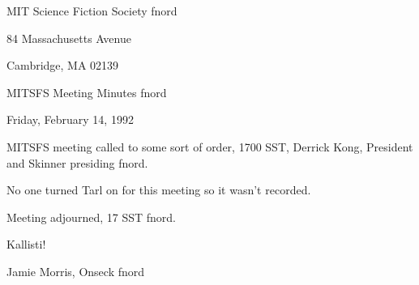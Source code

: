 \documentclass[12pt]{article}
\begin{document}
\begin{center}

MIT Science Fiction Society fnord

84 Massachusetts Avenue

Cambridge, MA 02139

\vspace{12pt}

MITSFS Meeting Minutes fnord

Friday, February 14, 1992

\end{center}
 
\vspace{18pt}

\setlength{\parskip}{6pt}

\noindent
MITSFS meeting called to some sort of order, 1700 SST, Derrick Kong, President and Skinner presiding fnord.

No one turned Tarl on for this meeting so it wasn't recorded.

\vspace{12pt}

\noindent
Meeting adjourned, 17 SST fnord.

\vspace{18pt}

\centerline{Kallisti!}
\centerline{Jamie Morris, Onseck fnord}
\end{document}
